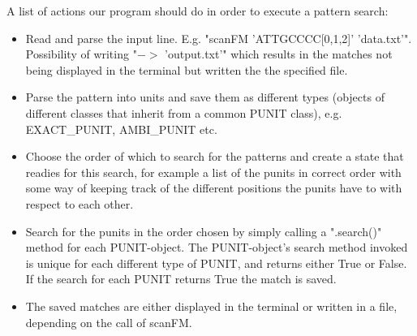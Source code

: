 \documentclass[12pt]{article}
\begin{document}
A list of actions our program should do in order to execute a pattern search:
\begin{itemize}
\item Read and parse the input line. E.g. "scanFM 'ATTGCCCC[0,1,2]' 'data.txt'". Possibility of writing "$->$ 'output.txt'"
which results in the matches not being displayed in the terminal but written the the specified file.
\item Parse the pattern into units and save them as different types (objects of different classes that inherit
from a common PUNIT class), e.g. EXACT\_PUNIT, AMBI\_PUNIT etc.
\item Choose the order of which to search for the patterns and create a state that readies for this search, for example a 
list of the punits in correct order with some way of keeping track of the different positions the punits have to with
respect to each other.
\item Search for the punits in the order chosen by simply calling a ".search()" method for each PUNIT-object.
The PUNIT-object's search method invoked is unique for each different type of PUNIT, and returns either True or False.
If the search for each PUNIT returns True the match is saved.
\item The saved matches are either displayed in the terminal or written in a file, depending on the call of scanFM. 
\end{itemize}
\end{document}
